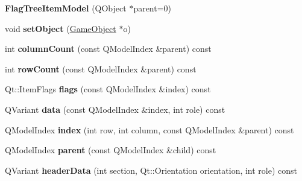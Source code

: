 \begin{DoxyCompactItemize}
\item 
\hypertarget{class_flag_tree_item_model_af0dbdaefea99e8bf0ccf247b7d99a3b9}{{\bfseries \-Flag\-Tree\-Item\-Model} (\-Q\-Object $\ast$parent=0)}\label{class_flag_tree_item_model_af0dbdaefea99e8bf0ccf247b7d99a3b9}

\item 
\hypertarget{class_flag_tree_item_model_af65b7aa347352ec15c648b922dd358ef}{void {\bfseries set\-Object} (\hyperlink{class_game_object}{\-Game\-Object} $\ast$o)}\label{class_flag_tree_item_model_af65b7aa347352ec15c648b922dd358ef}

\item 
\hypertarget{class_flag_tree_item_model_ad6a00e5fca9bd0b9ade572e2511f8401}{int {\bfseries column\-Count} (const \-Q\-Model\-Index \&parent) const }\label{class_flag_tree_item_model_ad6a00e5fca9bd0b9ade572e2511f8401}

\item 
\hypertarget{class_flag_tree_item_model_a997e3c0716e844a05b25d73e94db3808}{int {\bfseries row\-Count} (const \-Q\-Model\-Index \&parent) const }\label{class_flag_tree_item_model_a997e3c0716e844a05b25d73e94db3808}

\item 
\hypertarget{class_flag_tree_item_model_aa427bd54c7dbbff91243f9b3881c45ed}{\-Qt\-::\-Item\-Flags {\bfseries flags} (const \-Q\-Model\-Index \&index) const }\label{class_flag_tree_item_model_aa427bd54c7dbbff91243f9b3881c45ed}

\item 
\hypertarget{class_flag_tree_item_model_aaa1f651be87a4ea92da6bb80ed45b461}{\-Q\-Variant {\bfseries data} (const \-Q\-Model\-Index \&index, int role) const }\label{class_flag_tree_item_model_aaa1f651be87a4ea92da6bb80ed45b461}

\item 
\hypertarget{class_flag_tree_item_model_a140ab0b93de0c70e73981ef7d70dcf56}{\-Q\-Model\-Index {\bfseries index} (int row, int column, const \-Q\-Model\-Index \&parent) const }\label{class_flag_tree_item_model_a140ab0b93de0c70e73981ef7d70dcf56}

\item 
\hypertarget{class_flag_tree_item_model_ae6eefe6171c2aee060ec8d39403021ce}{\-Q\-Model\-Index {\bfseries parent} (const \-Q\-Model\-Index \&child) const }\label{class_flag_tree_item_model_ae6eefe6171c2aee060ec8d39403021ce}

\item 
\hypertarget{class_flag_tree_item_model_a8dbb4bf08c8dd4f63f5cf448dfaa4862}{\-Q\-Variant {\bfseries header\-Data} (int section, \-Qt\-::\-Orientation orientation, int role) const }\label{class_flag_tree_item_model_a8dbb4bf08c8dd4f63f5cf448dfaa4862}


\end{DoxyCompactItemize}
